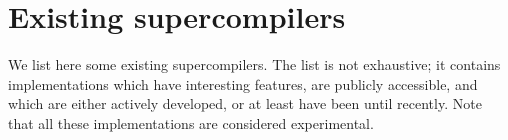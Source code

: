 \section{Existing supercompilers}
\label{sec:supercompilers}


We list here some existing supercompilers.
The list is not exhaustive; it contains implementations which have interesting features,
are publicly accessible,
and which are either actively developed, or at least have been until recently.
Note that all these implementations are considered experimental.

